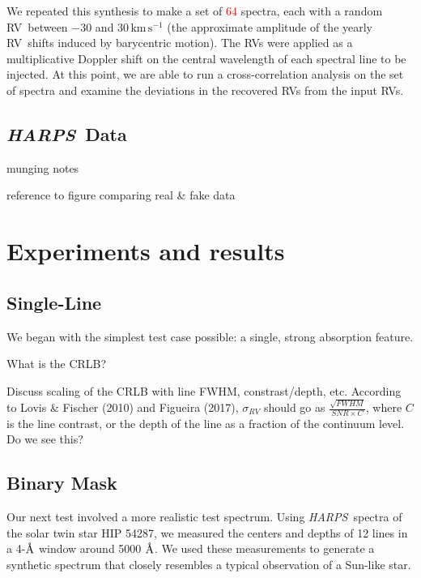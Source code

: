 \documentclass[modern]{aastex631}
\newcommand{\unit}[1]{\mathrm{#1}}
\newcommand{\km}{\unit{km}}
\newcommand{\s}{\unit{s}}
\newcommand{\kms}{\km\,\s^{-1}}
\newcommand{\ang}{\text{\normalfont\AA}}
\newcommand{\todo}[1]{\textcolor{red}{#1}}  %
\newcommand{\acronym}[1]{{\small{#1}}}
\newcommand{\project}[1]{\textsl{#1}}
\newcommand{\HARPS}{\project{\acronym{HARPS}}}
\newcommand{\RV}{\acronym{RV}}
\begin{document}
We repeated this synthesis to make a set of \todo{64} spectra, each with a random \RV\ between $-30$ and $30\,\kms$ (the approximate amplitude of the yearly \RV\ shifts induced by barycentric motion). 
The \RV s were applied as a multiplicative Doppler shift on the central wavelength of each spectral line to be injected. 
At this point, we are able to run a cross-correlation analysis on the set of spectra and examine the deviations in the recovered \RV s from the input \RV s.

\begin{figure}
\centering
\caption{}
\label{fig:spectra}
\end{figure}

\subsection{\HARPS\ Data}

munging notes

reference to figure comparing real \& fake data

\section{Experiments and results}
\label{s:experiments}

\subsection{Single-Line}
\label{s:singleline}

We began with the simplest test case possible: a single, strong absorption feature.

What is the CRLB?

Discuss scaling of the CRLB with line FWHM, constrast/depth, etc. According to Lovis \& Fischer (2010) and Figueira (2017), $\sigma_{RV}$ should go as $\frac{\sqrt{FWHM}}{SNR \times C}$, where $C$ is the line contrast, or the depth of the line as a fraction of the continuum level. Do we see this?

\subsection{Binary Mask}

Our next test involved a more realistic test spectrum. Using \HARPS\ spectra of the solar twin star HIP 54287, we measured the centers and depths of 12 lines in a 4-$\ang$ window around 5000 $\ang$. We used these measurements to generate a synthetic spectrum that closely resembles a typical observation of a Sun-like star.
\end{document}
